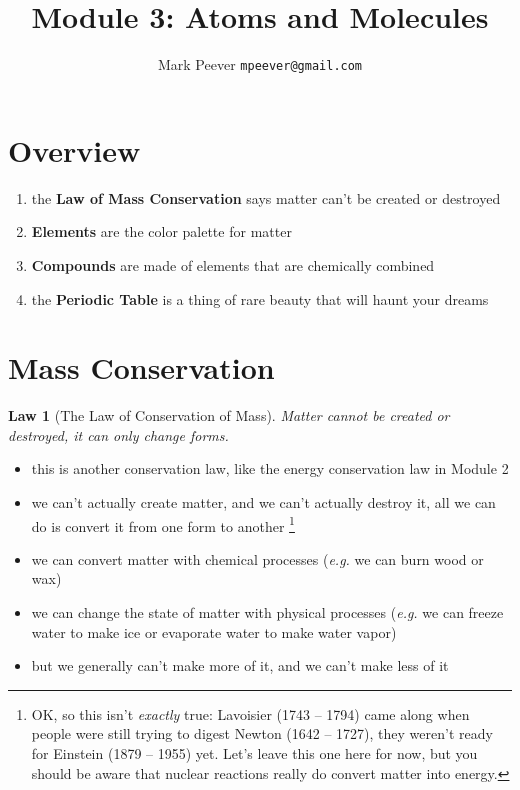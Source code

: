 \documentclass[11pt, oneside]{article}   	%
\title{Module 3: Atoms and Molecules }
\author{Mark Peever \texttt{mpeever@gmail.com}}
\newtheorem{law}{Law}
\begin{document}
\maketitle

\begin{center}

\end{center}

\section{Overview}
\begin{enumerate}
\item the \textbf{Law of Mass Conservation} says matter can't be created or destroyed
\item \textbf{Elements} are the color palette for matter
\item \textbf{Compounds} are made of elements that are chemically combined
\item the \textbf{Periodic Table} is a thing of rare beauty that will haunt your dreams
\end{enumerate}

\section{Mass Conservation}

\begin{law}[The Law of Conservation of Mass]\label{law-conservation-mass}
Matter cannot be created or destroyed, it can only change forms.
\end{law}

\begin{itemize}
\item this is another conservation law, like the energy conservation law in Module 2
\item we can't actually create matter, and we can't actually destroy it, all we can do is convert it from one form to another
\footnote{OK, so this isn't \emph{exactly} true: Lavoisier (1743 -- 1794) came along when people were still trying to digest Newton (1642 -- 1727), they weren't ready for Einstein (1879 -- 1955) yet. Let's leave this one here for now, but you should be aware that nuclear reactions really do convert matter into energy.}
\item we can convert matter with chemical processes (\emph{e.g.} we can burn wood or wax)
\item we can change the state of matter with physical processes (\emph{e.g.} we can freeze water to make ice or evaporate water to make water vapor)
\item but we generally can't make more of it, and we can't make less of it
\end{itemize}
\end{document}

